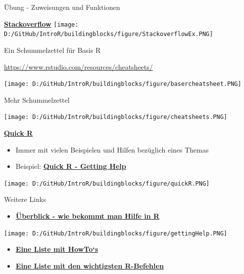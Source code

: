 \documentclass[ignorenonframetext,]{beamer}
\providecommand{\tightlist}{%
  \setlength{\itemsep}{0pt}\setlength{\parskip}{0pt}}
\begin{document}
\begin{frame}[fragile]{Übung - Zuweisungen und Funktionen}
\begin{frame}{\href{http://stackoverflow.com/}{\textbf{Stackoverflow}}}
\texttt{[image: D:/GitHub/IntroR/buildingblocks/figure/StackoverflowEx.PNG]}

\end{frame}

\begin{frame}{Ein Schummelzettel für Basis R}
\protect\hypertarget{ein-schummelzettel-fur-basis-r}{}

\url{https://www.rstudio.com/resources/cheatsheets/}

\texttt{[image: D:/GitHub/IntroR/buildingblocks/figure/basercheatsheet.PNG]}

\end{frame}

\begin{frame}{Mehr Schummelzettel}
\protect\hypertarget{mehr-schummelzettel}{}

\texttt{[image: D:/GitHub/IntroR/buildingblocks/figure/cheatsheets.PNG]}

\end{frame}

\begin{frame}{\href{http://www.statmethods.net/interface/help.html}{\textbf{Quick
R}}}
\protect\hypertarget{quick-r}{}

\begin{itemize}
\tightlist
\item
  Immer mit vielen Beispielen und Hilfen bezüglich eines Themas
\item
  Beispiel:
  \href{http://www.statmethods.net/interface/help.html}{\textbf{Quick R
  - Getting Help}}
\end{itemize}

\texttt{[image: D:/GitHub/IntroR/buildingblocks/figure/quickR.PNG]}

\end{frame}

\begin{frame}{Weitere Links}
\protect\hypertarget{weitere-links}{}

\begin{itemize}
\tightlist
\item
  \href{https://www.r-project.org/help.html}{\textbf{Überblick - wie
  bekommt man Hilfe in R}}
\end{itemize}

\texttt{[image: D:/GitHub/IntroR/buildingblocks/figure/gettingHelp.PNG]}

\begin{itemize}
\item
  \href{http://rprogramming.net/}{\textbf{Eine Liste mit HowTo`s}}
\item
  \href{https://www.personality-project.org/r/r.commands.html}{\textbf{Eine
  Liste mit den wichtigsten R-Befehlen}}
\end{itemize}


\end{frame}
\end{frame}
\end{document}

